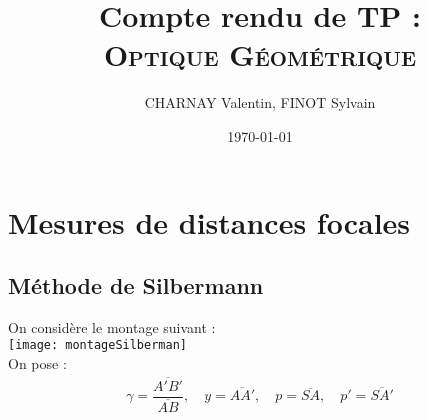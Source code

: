 \documentclass[12pt,a4paper]{article}
\author{CHARNAY Valentin, FINOT Sylvain}
\title{Compte rendu de TP :\\ \scshape Optique Géométrique}
\date{\today}
\begin{document}
\maketitle
\section{Mesures de distances focales}
\subsection{Méthode de Silbermann}
On considère le montage suivant :\\
\texttt{[image: montageSilberman]}\\
On pose : 
$$
\begin{aligned}
\gamma = \dfrac{\overline{A'B'}}{\overline{AB}} ,\quad y=\overline{AA'},\quad p=\overline{SA},\quad p'=\overline{SA'}
\end{aligned}
$$
\end{document}
